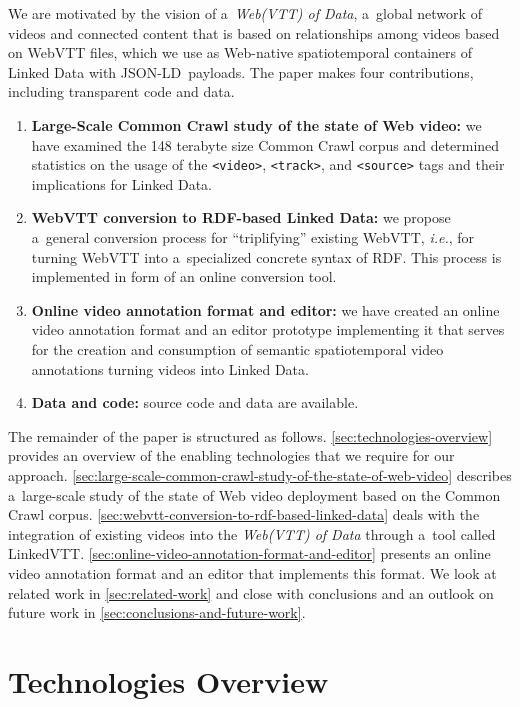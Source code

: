 \documentclass{sig-alternate-ceur}
\def\JSONLD{\mbox{JSON-LD}}
\begin{document}
We are motivated by the vision of a~\emph{Web(VTT) of Data},
a~global network of videos and connected content
that is based on relationships among videos based on WebVTT files,
which we use as Web-native spatiotemporal containers of Linked Data
with \JSONLD\ payloads.
The paper makes four contributions, including transparent code and data.

\begin{enumerate}[label=\textit{\roman*)},leftmargin=*]
  \item \textbf{Large-Scale Common Crawl study of the state of Web video:}
    we have examined the 148 terabyte size Common Crawl corpus
    and determined statistics on the usage of the \texttt{<video>},
    \texttt{<track>}, and \texttt{<source>} tags
    and their implications for Linked Data.
  \item \textbf{WebVTT conversion to RDF-based Linked Data:}
    we propose a~general conversion process for ``triplifying'' existing WebVTT,
    \emph{i.e.}, for turning WebVTT into a~specialized concrete syntax of RDF.
    This process is implemented in form of an online conversion tool.
  \item \textbf{Online video annotation format and editor:} we have created an
  online video annotation format and an editor prototype implementing it
  that serves for the creation
  and consumption of semantic spatiotemporal video annotations
  turning videos into Linked Data.
  \item \textbf{Data and code:} source code and data are available.
\end{enumerate}

The remainder of the paper is structured as follows.
\autoref{sec:technologies-overview} provides an overview
of the enabling technologies that we require for our approach.
\autoref{sec:large-scale-common-crawl-study-of-the-state-of-web-video}
describes a~large-scale study of the state of Web video deployment
based on the Common Crawl corpus.
\autoref{sec:webvtt-conversion-to-rdf-based-linked-data} deals with
the integration of existing videos into the \emph{Web(VTT) of Data}
through a~tool called LinkedVTT.
\autoref{sec:online-video-annotation-format-and-editor} presents
an online video annotation format and an editor that implements this format.
We look at related work in \autoref{sec:related-work} and close
with conclusions and an outlook on future work
in \autoref{sec:conclusions-and-future-work}.

\section{Technologies Overview}
\label{sec:technologies-overview}
\end{document}
